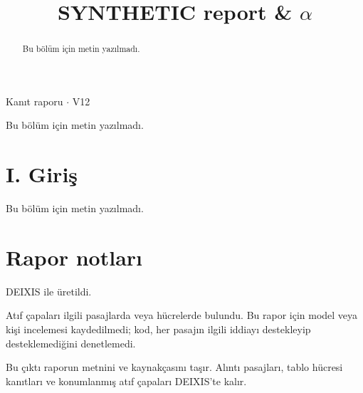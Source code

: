 \documentclass[journal]{IEEEtran}
\begin{document}
\renewcommand{\abstractname}{Özet}
\renewcommand{\IEEEkeywordsname}{Dizin Terimleri}
\renewcommand{\refname}{Kaynaklar}

\title{SYNTHETIC report \& \ensuremath{\alpha}}

\maketitle

\noindent Kanıt raporu \ensuremath{\cdot} V12

\begin{abstract}

Bu bölüm için metin yazılmadı.

\end{abstract}

\begin{IEEEkeywords}

Bu bölüm için metin yazılmadı.

\end{IEEEkeywords}

\section*{I. Giriş}

Bu bölüm için metin yazılmadı.

\section*{Rapor notları}

DEIXIS ile üretildi.

Atıf çapaları ilgili pasajlarda veya hücrelerde bulundu. Bu rapor için model veya kişi incelemesi kaydedilmedi; kod, her pasajın ilgili iddiayı destekleyip desteklemediğini denetlemedi.

Bu çıktı raporun metnini ve kaynakçasını taşır. Alıntı pasajları, tablo hücresi kanıtları ve konumlanmış atıf çapaları DEIXIS'te kalır.
\end{document}
